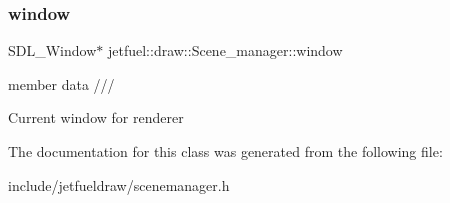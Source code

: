 \subsubsection{\texorpdfstring{window}{window}}
{\footnotesize\ttfamily S\+D\+L\+\_\+\+Window$\ast$ jetfuel\+::draw\+::\+Scene\+\_\+manager\+::window\hspace{0.3cm}{\ttfamily [protected]}}



member data /// 

Current window for renderer 

The documentation for this class was generated from the following file\+:\begin{DoxyCompactItemize}
\item 
include/jetfueldraw/scenemanager.\+h\end{DoxyCompactItemize}

